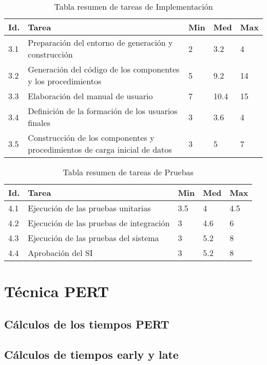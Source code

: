 \documentclass[11pt,a4paper,spanish,twoside]{report}
\begin{document}
\begin{table}[!h]
\centering
  \begin{tabular}{|p{0.8cm}||p{8cm}||p{0.75cm}|p{0.75cm}|p{0.75cm}|}
    \hline
    \textbf{Id.} & \textbf{Tarea} & \textbf{Min} &
    \textbf{Med} & \textbf{Max}\\
    \hline
    3.1 & Preparación del entorno de generación y construcción & 2 & 3.2  & 4 \\
    \hline
    3.2 & Generación del código de los componentes y los procedimientos & 5 &
    9.2 & 14\\
    \hline
    3.3 & Elaboración del manual de usuario & 7 & 10.4 & 15\\
    \hline
    3.4 & Definición de la formación de los usuarios finales & 3 & 3.6 & 4 \\
    \hline
    3.5 & Construcción de los componentes y procedimientos de carga inicial
    de datos & 3 & 5 & 7\\
    \hline
  \end{tabular}
  \caption{Tabla resumen de tareas de Implementación} \label{Tab:tareas3}
\end{table}

\begin{table}[!h]
\centering
  \begin{tabular}{|p{0.8cm}||p{8cm}||p{0.75cm}|p{0.75cm}|p{0.75cm}|}
    \hline
    \textbf{Id.} & \textbf{Tarea} & \textbf{Min} &
    \textbf{Med} & \textbf{Max}\\
    \hline
    4.1 & Ejecución de las pruebas unitarias & 3.5 & 4 & 4.5\\
    \hline
    4.2 & Ejecución de las pruebas de integración & 3 & 4.6 & 6\\
    \hline
    4.3 & Ejecución de las pruebas del sistema & 3 & 5.2 & 8\\
    \hline
    4.4 & Aprobación del SI & 3 & 5.2 & 8 \\
    \hline
  \end{tabular}
  \caption{Tabla resumen de tareas de Pruebas} \label{Tab:tareas4}
\end{table}


\chapter{Técnica PERT}
\section{Cálculos de los tiempos PERT}
\section{Cálculos de tiempos early y late}
\end{document}
